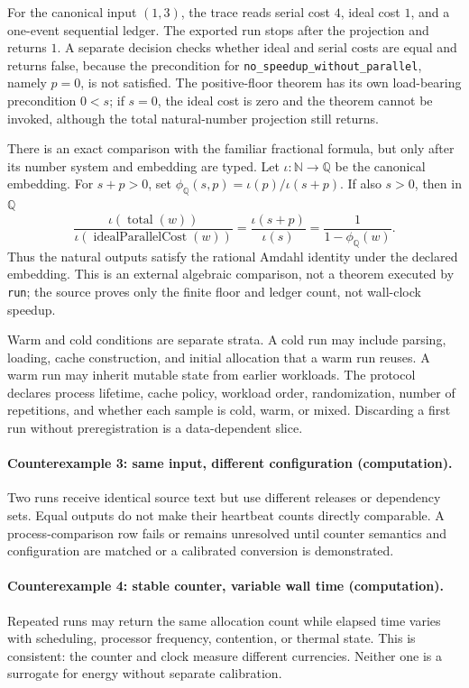 For the canonical input \((1,3)\), the trace reads serial cost \(4\), ideal cost \(1\), and a one-event sequential
ledger.  The exported run stops after the projection and returns \(1\).  A separate decision checks whether ideal and
serial costs are equal and returns false, because the precondition for \texttt{no\_speedup\_without\_parallel}, namely
\(p=0\), is not satisfied.  The positive-floor theorem has its own load-bearing precondition \(0<s\); if \(s=0\), the
ideal cost is zero and the theorem cannot be invoked, although the total natural-number projection still returns.

There is an exact comparison with the familiar fractional formula, but only after its number system and embedding are
typed.  Let \(\iota:\mathbb N\to\mathbb Q\) be the canonical embedding.  For \(s+p>0\), set
\(\phi_{\mathbb Q}(s,p)=\iota(p)/\iota(s+p)\).  If also \(s>0\), then in \(\mathbb Q\)
\[
 \frac{\iota(\operatorname{total}(w))}
      {\iota(\operatorname{idealParallelCost}(w))}
 =\frac{\iota(s+p)}{\iota(s)}
 =\frac{1}{1-\phi_{\mathbb Q}(w)}.
\]
Thus the natural outputs satisfy the rational Amdahl identity under the declared embedding.  This is an external
algebraic comparison, not a theorem executed by \texttt{run}; the source proves only the finite floor and ledger count,
not wall-clock speedup.

Warm and cold conditions are separate strata.  A cold run may include parsing, loading, cache construction, and
initial allocation that a warm run reuses.  A warm run may inherit mutable state from earlier workloads.  The
protocol declares process lifetime, cache policy, workload order, randomization, number of repetitions, and whether
each sample is cold, warm, or mixed.  Discarding a first run without preregistration is a data-dependent slice.

\paragraph{Counterexample 3: same input, different configuration (computation).}
Two runs receive identical source text but use different releases or dependency sets.  Equal outputs do not make
their heartbeat counts directly comparable.  A process-comparison row fails or remains unresolved until counter
semantics and configuration are matched or a calibrated conversion is demonstrated.

\paragraph{Counterexample 4: stable counter, variable wall time (computation).}
Repeated runs may return the same allocation count while elapsed time varies with scheduling, processor frequency,
contention, or thermal state.  This is consistent: the counter and clock measure different currencies.  Neither one
is a surrogate for energy without separate calibration.

